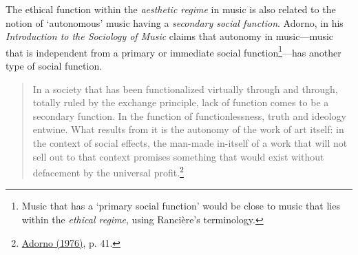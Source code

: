 The ethical function within the \emph{aesthetic regime} in music is also related to the notion of `autonomous' music having a \emph{secondary social function}. Adorno, in his \emph{Introduction to the Sociology of Music} claims that autonomy in music---music that is independent from a primary or immediate social function\footnote{Music that has a `primary social function' would be close to music that lies within the \emph{ethical regime}, using Ranci\`{e}re's terminology.}---has another type of social function.
\begin{quote}
In a society that has been functionalized virtually through and through, totally ruled by the exchange principle, lack of function comes to be a secondary function. In the function of functionlessness, truth and ideology entwine. What results from it is the autonomy of the work of art itself: in the context of social effects, the man-made in-itself of a work that will not sell out to that context promises something that would exist without defacement by the universal profit.\footnote{\hyperlink{adornointro}{Adorno (1976)}, p. 41.}
\end{quote}
